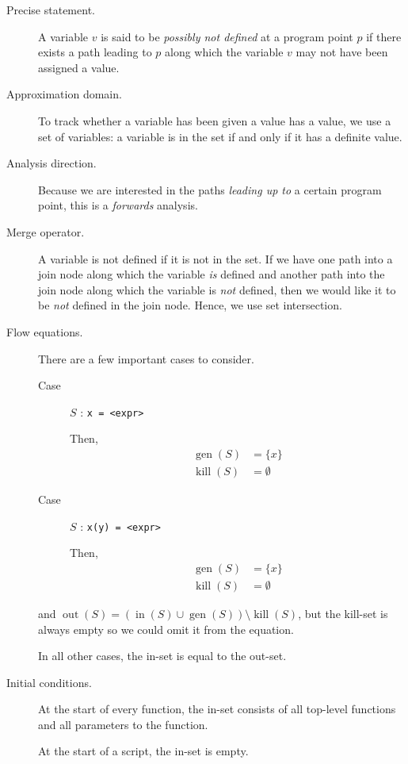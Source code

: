 \documentclass[letterpaper,11pt]{article}
\DeclareMathOperator{\genOp}{gen}
\DeclareMathOperator{\killOp}{kill}
\DeclareMathOperator{\insetOp}{in}
\DeclareMathOperator{\outsetOp}{out}
\newcommand{\gen}[1]{\genOp{\left(#1\right)}}
\newcommand{\killset}[1]{\killOp{\left(#1\right)}}
\newcommand{\inset}[1]{\insetOp{\left(#1\right)}}
\newcommand{\outset}[1]{\outsetOp{\left(#1\right)}}
\begin{document}
\begin{description}
    \item[Precise statement.]
        A variable $v$ is said to be \emph{possibly not defined} at a program
        point $p$ if there exists a path leading to $p$ along which the
        variable $v$ may not have been assigned a value.

    \item[Approximation domain.]
        To track whether a variable has been given a value has a value, we use
        a set of variables: a variable is in the set if and only if it has a
        definite value.

    \item[Analysis direction.]
        Because we are interested in the paths \emph{leading up to} a certain
        program point, this is a \emph{forwards} analysis.

    \item[Merge operator.]
        A variable is not defined if it is not in the set. If we have one path
        into a join node along which the variable \emph{is} defined and
        another path into the join node along which the variable is \emph{not}
        defined, then we would like it to be \emph{not} defined in the join
        node. Hence, we use set intersection.

    \item[Flow equations.]
        There are a few important cases to consider.

        \begin{description}
            \item[Case] $S$ : \texttt{x = <expr>}

                Then,
                \begin{align*}
                    \gen{S} &= \{x\} \\
                    \killset{S} &= \emptyset
                \end{align*}

            \item[Case] $S$ : \texttt{x(y) = <expr>}

                Then,
                \begin{align*}
                    \gen{S} &= \{x\} \\
                    \killset{S} &= \emptyset
                \end{align*}
        \end{description}
        and
        $\outset{S} = \left(\inset{S} \cup \gen{S}\right) \setminus \killset{S}$,
        but the kill-set is always empty so we could omit it from the equation.

        In all other cases, the in-set is equal to the out-set.

    \item[Initial conditions.]
        At the start of every function, the in-set consists of all top-level
        functions and all parameters to the function.

        At the start of a script, the in-set is empty.
\end{description}
\end{document}

